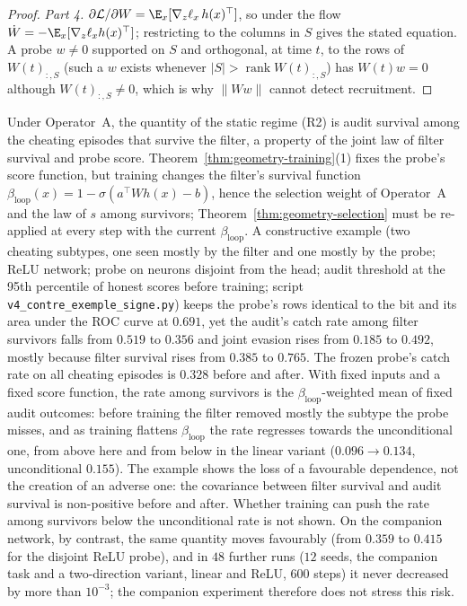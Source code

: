 \begin{proof}
\emph{Part 4.} $\partial \mathcal{L}/\partial W = \E_x[\nabla_z \ell_x\, h(x)^\top]$, so under the flow $\dot W = -\E_x[\nabla_z\ell_x h(x)^\top]$; restricting to the columns in $S$ gives the stated equation. A probe $w \neq 0$ supported on $S$ and orthogonal, at time $t$, to the rows of $W(t)_{:,S}$ (such a $w$ exists whenever $|S| > \operatorname{rank} W(t)_{:,S}$) has $W(t) w = 0$ although $W(t)_{:,S} \neq 0$, which is why $\|Ww\|$ cannot detect recruitment.
\end{proof}

\begin{remark}\label{rem:instrument-vs-audit}
Under Operator~A, the quantity of the static regime (R2) is audit survival among the cheating episodes that survive the filter, a property of the joint law of filter survival and probe score. Theorem~\ref{thm:geometry-training}(1) fixes the probe's score function, but training changes the filter's survival function $\beta_{\mathrm{loop}}(x) = 1 - \sigma(a^\top W h(x) - b)$, hence the selection weight of Operator~A and the law of $s$ among survivors; Theorem~\ref{thm:geometry-selection} must be re-applied at every step with the current $\beta_{\mathrm{loop}}$. A constructive example (two cheating subtypes, one seen mostly by the filter and one mostly by the probe; ReLU network; probe on neurons disjoint from the head; audit threshold at the 95th percentile of honest scores before training; script \texttt{v4\_contre\_exemple\_signe.py}) keeps the probe's rows identical to the bit and its area under the ROC curve at $0.691$, yet the audit's catch rate among filter survivors falls from $0.519$ to $0.356$ and joint evasion rises from $0.185$ to $0.492$, mostly because filter survival rises from $0.385$ to $0.765$. The frozen probe's catch rate on all cheating episodes is $0.328$ before and after. With fixed inputs and a fixed score function, the rate among survivors is the $\beta_{\mathrm{loop}}$-weighted mean of fixed audit outcomes: before training the filter removed mostly the subtype the probe misses, and as training flattens $\beta_{\mathrm{loop}}$ the rate regresses towards the unconditional one, from above here and from below in the linear variant ($0.096\to0.134$, unconditional $0.155$). The example shows the loss of a favourable dependence, not the creation of an adverse one: the covariance between filter survival and audit survival is non-positive before and after. Whether training can push the rate among survivors below the unconditional rate is not shown. On the companion network, by contrast, the same quantity moves favourably (from $0.359$ to $0.415$ for the disjoint ReLU probe), and in $48$ further runs ($12$ seeds, the companion task and a two-direction variant, linear and ReLU, $600$ steps) it never decreased by more than $10^{-3}$; the companion experiment therefore does not stress this risk.
\end{remark}

